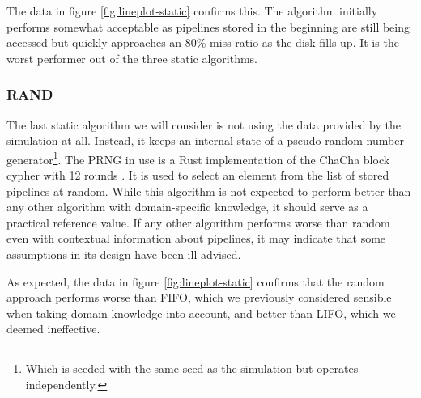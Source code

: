         The data in figure \ref{fig:lineplot-static} confirms this. The algorithm initially performs somewhat acceptable as pipelines stored in the beginning are still being accessed but quickly approaches an 80\% miss-ratio as the disk fills up. It is the worst performer out of the three static algorithms.
        
    \subsubsection{RAND}
        The last static algorithm we will consider is not using the data provided by the simulation at all. Instead, it keeps an internal state of a pseudo-random number generator\footnote{Which is seeded with the same seed as the simulation but operates independently.}. The PRNG in use is a Rust implementation of the ChaCha block cypher with 12 rounds \cite{rand-docs}. It is used to select an element from the list of stored pipelines at random. While this algorithm is not expected to perform better than any other algorithm with domain-specific knowledge, it should serve as a practical reference value. If any other algorithm performs worse than random even with contextual information about pipelines, it may indicate that some assumptions in its design have been ill-advised.
        
        As expected, the data in figure \ref{fig:lineplot-static} confirms that the random approach performs worse than FIFO, which we previously considered sensible when taking domain knowledge into account, and better than LIFO, which we deemed ineffective.